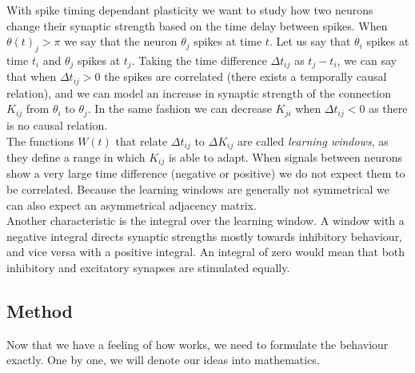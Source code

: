 With spike timing dependant plasticity we want to study how two neurons change their synaptic strength based on the time delay between spikes. When $\theta(t)_j > \pi$ we say that the neuron $\theta_j$ spikes at time $t$. 
Let us say that $\theta_i$ spikes at time $t_i$ and $\theta_j$ spikes at $t_j$. Taking the time difference $\Delta t_{ij}$ as $t_j - t_i$, we can say that when $\Delta t_{ij} > 0$ the spikes are correlated (there exists a temporally causal relation), and we can model an increase in synaptic strength of the connection $K_{ij}$ from $\theta_i$ to $\theta_j$. In the same fashion we can decrease $K_{ji}$ when $\Delta t_{ij} < 0$ as there is no causal relation. \\
The functions $W(t)$ that relate $\Delta t_{ij}$ to $\Delta K_{ij}$ are called \textsl{learning windows},  as they define a range in which $K_{ij}$ is able to adapt. When signals between neurons show a very large time difference (negative or positive) we do not expect them to be correlated. Because the learning windows are generally not symmetrical we can also expect an asymmetrical adjacency matrix.\\
Another characteristic is the integral over the learning window. A window with a negative integral directs synaptic strengths mostly towards inhibitory behaviour, and vice versa with a positive integral. An integral of zero would mean that both inhibitory and excitatory synapses are stimulated equally.\\

\subsection{Method}
Now that we have a feeling of how \STDP works, we need to formulate the behaviour exactly. One by one, we will denote our ideas into mathematics.

